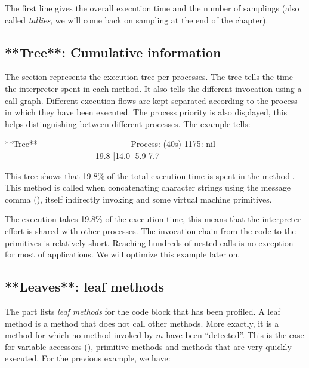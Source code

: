 \documentclass[a4paper,10pt,twoside]{book}
\begin{document}
The first line gives the overall execution time and the number of samplings (also called \emph{tallies}, we will come back on sampling at the end of the chapter). 

\subsection{**Tree**: Cumulative information}

The  section represents the execution tree per processes. The tree tells the time the \pharo interpreter spent in each method. It also tells  the different invocation using a call graph. Different execution flows are kept separated according to the process in which they have been executed. The process priority is also displayed, this helps distinguishing between different processes. The example tells:

\begin{code}
**Tree**
--------------------------------
Process: (40s)  1175: nil
--------------------------------
19.8%
  |14.0%
  |5.9%
7.7%
\end{code}

This tree shows that 19.8\% of the total execution time is spent in the method . This method is called when concatenating character strings using the message comma (\ct{,}), itself indirectly invoking  and some virtual machine primitives.

The execution takes 19.8\% of the execution time, this means that the interpreter effort is shared with other processes. The invocation chain from the code to the primitives is relatively short. Reaching hundreds of nested calls is no exception for most of applications. We will optimize this example later on.


\subsection{**Leaves**: leaf methods}

The  part lists \emph{leaf methods} for the code block that has been profiled. A leaf method is a method that does not call other methods. More exactly, it is a method  for which no method invoked by $m$ have been ``detected''. This is the case for variable accessors (\eg  {}), primitive methods and methods that are very quickly executed. For the previous example, we have:
\end{document}
